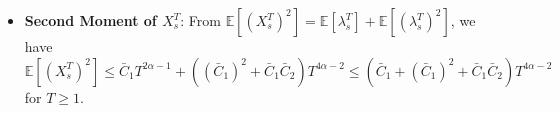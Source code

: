 \documentclass[letterpaper]{article}
\numberwithin{equation}{section}
\theoremstyle{definition}
\theoremstyle{remark}
\begin{document}
\begin{itemize}
    Applying these uniform bounds for $s = \lfloor tT \rfloor$, we get:
    \begin{align*}
        \mathbb{E}[(\kappa_s^T)^2] 
        &= \sum_{k=1}^{s-1} (A_k^T)^2 \mathbb{E}[\lambda_{s-k}^T] \\
        &\le \left( \sup_{j \ge 1} \mathbb{E}[\lambda_j^T] \right) \left( \sum_{k=1}^{s-1} (A_k^T)^2 \right) \\
        &\le (\bar{C}_1 T^{2\alpha-1}) \cdot (\bar{C}_2 T^{2\alpha-1}) \\
        &= \bar{C}_1 \bar{C}_2 T^{4\alpha-2}.
    \end{align*}
    This provides the required non-asymptotic upper bound for the second moment.
    
    
    Since $(q_s^T)^2 =(\mathbb E[\lambda_s^T])^2 \le (\bar C_1)^2T^{4\alpha-2}$, we finally conclude that 
    \[
      \mathbb E[(\lambda_s^T)^2] \le \left((\bar C_1)^2+\bar C_1\bar C_2\right)\cdot T^{4\alpha-2}.
    \]
    
    \item \textbf{Second Moment of $X_s^T$}: From $\mathbb E[(X_s^T)^2] = \mathbb E[\lambda_s^T] + \mathbb E[(\lambda_s^T)^2]$, we have 
    \begin{equation}\label{eq:XTsecondmoment}
        \mathbb E[(X_s^T)^2] 
        \le \bar C_1 T^{2\alpha-1}+\left((\bar C_1)^2+\bar C_1\bar C_2\right) T^{4\alpha-2}
        \le \left(\bar C_1+(\bar C_1)^2+\bar C_1\bar C_2\right) T^{4\alpha-2}
    \end{equation}
    for $T\ge1$.
\end{itemize}
\end{document}
